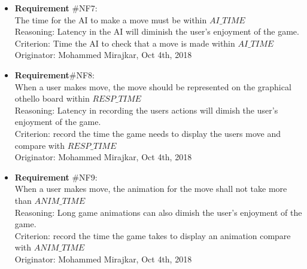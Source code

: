 \documentclass[12pt, titlepage]{article}
\renewcommand{\bf}{\textbf}
\begin{document}
\begin{itemize}

	\item {\color {blue}\bf{ Requirement}} \#NF{\color {blue}7:}\\
	      The time for the AI to make a move must be within $AI\_TIME$\\
	      Reasoning: Latency in the AI will diminish the user's enjoyment of the game.\\
	      Criterion: Time the AI to check that a move is made within $AI\_TIME$\\
	      Originator: Mohammed Mirajkar, Oct 4th, 2018

	\item  {\color {blue}\bf{ Requirement}}\#NF{\color {blue}8:}\\
	      When a user makes move, the move should be represented on the graphical othello board within $RESP\_TIME$\\
	      Reasoning: Latency in recording the users actions will dimish the user's enjoyment of the game.\\
	      Criterion: record the time the game needs to display the users move and compare with $RESP\_TIME$\\
	      Originator: Mohammed Mirajkar, Oct 4th, 2018

	\item {\color {blue}\bf{ Requirement}} \#NF{\color {blue}9:}\\
	      When a user makes move, the animation for the move shall not take more than  $ANIM\_TIME$\\
	      Reasoning: Long game animations can also dimish the user's enjoyment of the game.\\
	      Criterion:  record the time the game takes to display an animation compare with  $ANIM\_TIME$\\
	      Originator: Mohammed Mirajkar, Oct 4th, 2018

\end{itemize}
\end{document}
